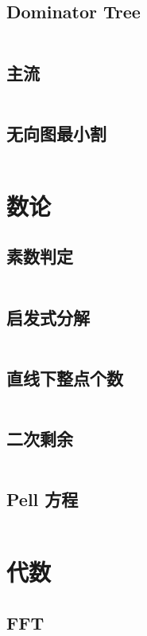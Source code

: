 \documentclass[titlepage,landscape,a4paper,10pt]{article}
\begin{document}
\begin{multicols}{2}
\begin{spacing}{0.8}
\subsection{Dominator Tree}
\inputminted{cpp}{improve/DominatorTree.cpp}

\subsection{主流}
\inputminted{cpp}{improve/MincostFlow.cpp}

\subsection{无向图最小割}
\inputminted{cpp}{src/无向图最小割.cpp}

\section{数论}

\subsection{素数判定}
\inputminted{cpp}{src/素数判定.cpp}

\subsection{启发式分解}
\inputminted{cpp}{src/启发式分解.cpp}

\subsection{直线下整点个数}
\inputminted{cpp}{src/直线下格点统计.cpp}

\subsection{二次剩余}
\inputminted{cpp}{src/二次剩余.cpp}

\subsection{Pell 方程}
\inputminted{cpp}{src/Pell方程.cpp}

\section{代数}

\subsection{FFT}
\inputminted{cpp}{improve/FFT.cpp}


\end{spacing}
\end{multicols}
\end{document}
